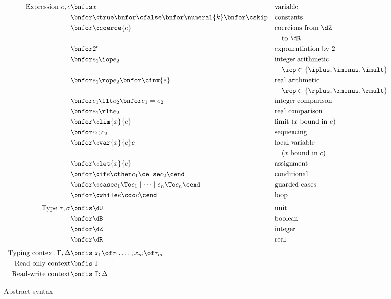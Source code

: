 \begin{figure}
  \centering
  \begin{mdframed}
  \small
  \begin{align*}
  \text{Expression}\ e, c
  \bnfis& x                               &&\text{variable}\\
  \bnfor& \ctrue \bnfor \cfalse \bnfor \numeral{k} \bnfor \cskip
                                          &&\text{constants}\\
  \bnfor& \ccoerce{e}                     &&\text{coercions from $\dZ$}\\ 
  & &&\quad \text{to $\dR$}\\
  \bnfor& 2^e                             &&\text{exponentiation by $2$}\\
  \bnfor& e_1 \iop e_2                    &&\text{integer arithmetic} \\ 
  & &&\quad\text{${\iop} \in \{{\iplus}, {\iminus}, {\imult}\}$}\\
  \bnfor& e_1 \rop e_2 \bnfor \cinv{e}    &&\text{real arithmetic} \\
  & &&\quad\text{${\rop} \in \{{\rplus}, {\rminus}, {\rmult}\}$} \\
  \bnfor& e_1 \ilt e_2 \bnfor e_1 = e_2   &&\text{integer comparison}\\
  \bnfor& e_1 \rlt e_2                    &&\text{real comparison}\\
  \bnfor& \clim{x}{e}                     &&\text{limit ($x$ bound in $e$)} \\
  \bnfor& c_1 ; c_2                       &&\text{sequencing}\\
  \bnfor& \cvar{x}{e} c                   &&\text{local variable}\\
   & && \quad\text{($x$ bound in $c$)}\\
  \bnfor& \clet{x}{e}                     &&\text{assignment}\\
  \bnfor& \cif e \cthen c_1 \celse c_2 \cend
                                          &&\text{conditional}\\
  \bnfor& \ccase e_1 \To c_1 \mid \cdots \mid e_n \To c_n \cend
                                          &&\text{guarded cases}\\
  \bnfor& \cwhile e \cdo c \cend          &&\text{loop} \\[1ex]
  \text{Type}\ \tau, \sigma
  \bnfis& \dU                             &&\text{unit}\\
  \bnfor& \dB                             &&\text{boolean}\\
  \bnfor& \dZ                             &&\text{integer}\\
  \bnfor& \dR                             &&\text{real} \\[1ex]
  \text{Typing context}\ \Gamma, \Delta
  \bnfis& \ x_1 \of \tau_1, \ldots, x_m \of \tau_m \\
  \text{Read-only context}
  \bnfis& \ \Gamma \\
  \text{Read-write context}
  \bnfis& \ \Gamma; \Delta
  \end{align*}
  \end{mdframed}
  \caption{Abstract syntax}
  \label{fig:syntax}
\end{figure}
